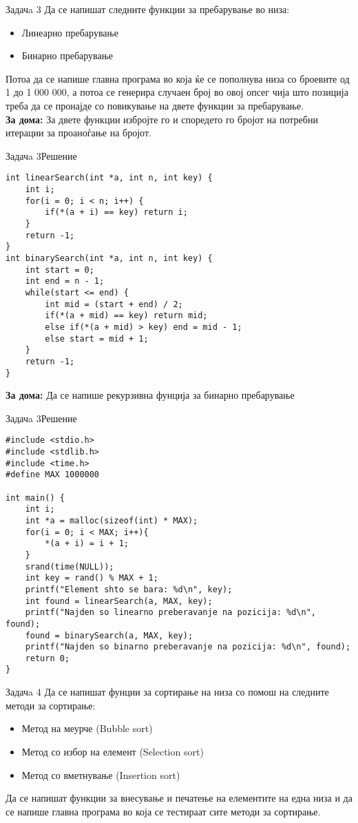 \begin{frame}{Задачa 3}
Да се напишат следните функции за пребарување во низа:
\begin{itemize}
  \item Линеарно пребарување
  \item Бинарно пребарување
\end{itemize}  
Потоа да се напише главна програма во која ќе се пополнува низа со
броевите од 1 до 1 000 000, а потоа се генерира случаен број во овој опсег чија
што позиција треба да се пронајде со повикување на двете функции за
пребарување.\\
\textbf{За дома:} За двете функции избројте го и споредето го бројот на потребни
итерации за проаноѓање на бројот.
\end{frame}


\begin{frame}[fragile]{Задачa 3}{Решение}
\begin{lstlisting}
int linearSearch(int *a, int n, int key) {
    int i;
    for(i = 0; i < n; i++) {
        if(*(a + i) == key) return i;
    }
    return -1;
}
int binarySearch(int *a, int n, int key) {
    int start = 0;
    int end = n - 1;
    while(start <= end) {
        int mid = (start + end) / 2;
        if(*(a + mid) == key) return mid;
        else if(*(a + mid) > key) end = mid - 1;
        else start = mid + 1;
    }
    return -1;
}
\end{lstlisting}
\textbf{За дома:} Да се напише рекурзивна фунција за бинарно пребарување
\end{frame}

\begin{frame}[fragile]{Задачa 3}{Решение}
\begin{lstlisting}
#include <stdio.h>
#include <stdlib.h>
#include <time.h>
#define MAX 1000000

int main() {
    int i;
    int *a = malloc(sizeof(int) * MAX);
    for(i = 0; i < MAX; i++){
        *(a + i) = i + 1;
    }
    srand(time(NULL));
    int key = rand() % MAX + 1;
    printf("Element shto se bara: %d\n", key);
    int found = linearSearch(a, MAX, key);
    printf("Najden so linearno preberavanje na pozicija: %d\n", found);
    found = binarySearch(a, MAX, key);
    printf("Najden so binarno preberavanje na pozicija: %d\n", found);
    return 0;
}
\end{lstlisting}
\end{frame}


\begin{frame}{Задачa 4}
Да се напишат фунции за сортирање на низа со помош на следните методи за
сортирање:
\begin{itemize}
  \item Метод на меурче (Bubble sort)
  \item Метод со избор на елемент (Selection sort)
  \item Метод со вметнување (Insertion sort)
\end{itemize}
Да се напишат функции за внесување и печатење на елементите на една низа и да се
напише главна програма во која се тестираат сите методи за сортирање.
\end{frame}


